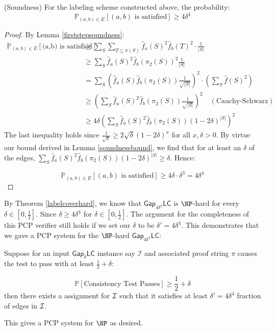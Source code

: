 \begin{proposition} (Soundness)
    For the labeling scheme constructed above, the probability:
    \begin{equation}
      \mathbb{P}_{(a,b) \in E}[ (a,b) \text{ is satisfied}] \geq 4\delta^4
    \end{equation}
\end{proposition}
%
\begin{proof}
  By Lemma \ref{firststepsoundness}:
  \begin{align*}
    \mathbb{P}_{(a,b) \in E}[ \text{(a,b) is satisfied}] & \geq \sum_{S} \sum_{T \subseteq \pi(S)} \widehat{f}_a(S)^2\widehat{f}_b(T)^2 \cdot \frac{1}{|S|} \\
    & \geq \sum_{S} \widehat{f}_a(S)^2\widehat{f}_b(\pi_2(S))^2  \frac{1}{|S|} \\
    & =  \sum_{S} \left(\widehat{f}_a(S)\widehat{f}_b(\pi_2(S))  \frac{1}{\sqrt{|S|}}\right)^2 \cdot \left(\sum_{S}\widehat{f}(S)^2 \right) \\
    & \geq \left(\sum_{S} \widehat{f}_a(S)^2\widehat{f}_b(\pi_2(S))  \frac{1}{\sqrt{|S|}} \right)^2 \quad (\text{Cauchy-Schwarz}) \\
    & \geq 4\delta\left(\sum_{S} \widehat{f}_a(S)^2\widehat{f}_b(\pi_2(S))  (1 - 2\delta)^{|S|} \right)^2
  \end{align*}
  The last inequality holds since $\frac{1}{\sqrt{x}} \geq 2\sqrt{\delta}(1-2\delta)^x$ for all $x, \delta > 0$. By virtue our bound derived in Lemma \ref{soundnessbound}, we find that for at least an $\delta$ of the edges,
  $\sum_{S} \widehat{f}_a(S)^2\widehat{f}_b(\pi_2(S))  (1 - 2\delta)^{|S|} \geq \delta$. Hence:

  \begin{equation}
          \mathbb{P}_{(a,b) \in E}[ (a,b) \text{ is satisfied}] \geq 4\delta\cdot\delta^3 = 4\delta^4
  \end{equation}
\end{proof}

By Theorem \ref{labelcoverhard}, we know that $\mathsf{Gap}_{4\delta^4}\mathsf{LC}$ is $\NP$-hard for every $\delta \in [0,\frac{1}{2}]$. Since $\delta
\geq 4\delta^4$ for $\delta \in [0,\frac{1}{2}]$. The argument for the completeness of this PCP verifier still holds if we set our $\delta$ to be $\delta' = 4\delta^4$. This demonstrates that we gave a PCP system for the $\NP$-hard $\mathsf{Gap}_{4\delta^4}\mathsf{LC}$:

\begin{proposition}
  Suppose for an input $\mathsf{Gap}_{\delta}\mathsf{LC}$ instance say $\mathcal{I}$ and associated proof string $\pi$  causes the test to pass with at least $\frac{1}{2} + \delta$:

  \begin{equation}
    \mathbb{P}[\text{Consistency Test Passes}] \geq \frac{1}{2} + \delta
  \end{equation}
  then there exists a assignment for $\mathcal{I}$ such that it satisfies at least $\delta' = 4\delta^4$ fraction of edges in $\mathcal{I}$.
\end{proposition}
This gives a PCP system for $\NP$ as desired.
